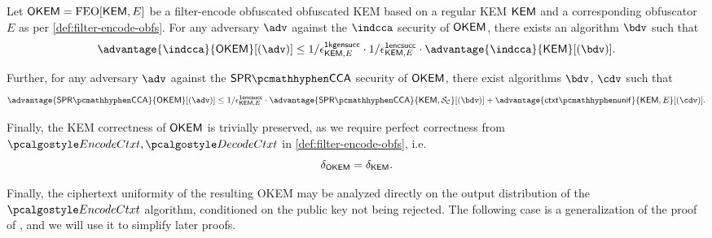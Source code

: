 \begin{theorem}
\label{thm:filter-encode-security}
    Let $\mathsf{OKEM} = \textsf{\textnormal{FEO}}[\mathsf{KEM}, E]$ be a filter-encode obfuscated obfuscated KEM based on a regular KEM $\mathsf{KEM}$ and a corresponding obfuscator $E$ as per \cref{def:filter-encode-obfs}.
    For any adversary $\adv$ against the $\indcca$ security of $\mathsf{OKEM}$, there exists an algorithm $\bdv$ such that
    \[
        \advantage{\indcca}{\OKEM}[(\adv)]
        \leq
        1/\epsilon^\firstkeygensuccess_{\KEM,E}
        \cdot 1/\epsilon^\firstencapssuccess_{\KEM,E}
        \cdot \advantage{\indcca}{\KEM}[(\bdv)].
    \]

    Further, for any adversary $\adv$ against the $\sprcca$ security of $\mathsf{OKEM}$, there exist algorithms $\bdv$, $\cdv$ such that
    \[
        \advantage{\sprcca}{\OKEM}[(\adv)]
        \leq 
        1/\epsilon^\firstencapssuccess_{\KEM,E}
        \cdot \advantage{\sprcca}{\KEM,\simulunif}[(\bdv)]
        + \advantage{\ctxtunif}{\KEM,E}[(\cdv)].
    \]

    Finally, the KEM correctness of $\mathsf{OKEM}$ is trivially preserved, as we require perfect correctness from $\encodectxt,\decodectxt$ in \cref{def:filter-encode-obfs}, i.e.
    \[
        \delta_{\mathsf{OKEM}} = \delta_{\mathsf{KEM}}.
    \]
\end{theorem}

Finally, the ciphertext uniformity of the resulting OKEM may be analyzed directly on the output distribution of the $\encodectxt$ algorithm, conditioned on the public key not being rejected. The following case is a generalization of the proof of \cite[Lemma~2.15]{CCS:GunSteVei24}, and we will use it to simplify later proofs.

